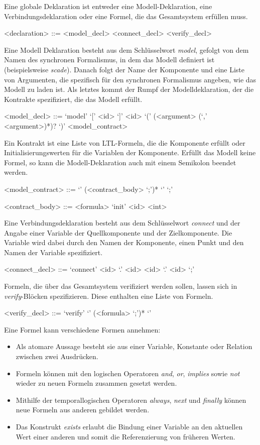 Eine globale Deklaration ist entweder eine Modell-Deklaration, eine Verbindungsdeklaration oder eine Formel, die das Gesamtsystem erfüllen muss.
\begin{grammar}
  <declaration> ::= <model\_decl>
  \alt <connect\_decl>
  \alt <verify\_decl>
\end{grammar}
Eine Modell Deklaration besteht aus dem Schlüsselwort \emph{model}, gefolgt von dem Namen des synchronen Formalismus, in dem das Modell definiert ist (beispielsweise \emph{scade}).
Danach folgt der Name der Komponente und eine Liste von Argumenten, die spezifisch für den synchronen Formalismus angeben, wie das Modell zu laden ist.
Als letztes kommt der Rumpf der Modelldeklaration, der die Kontrakte spezifiziert, die das Modell erfüllt.
\begin{grammar}
  <model\_decl> ::= `model' `[' <id> `]' <id> `(' (<argument> (`,' <argument>)*)? `)' <model\_contract>
\end{grammar}
Ein Kontrakt ist eine Liste von LTL-Formeln, die die Komponente erfüllt oder Initialisierungswerten für die Variablen der Komponente.
Erfüllt das Modell keine Formel, so kann die Modell-Deklaration auch mit einem Semikolon beendet werden.
\begin{grammar}
  <model\_contract> ::= `{' (<contract\_body> `;')* `}'
  \alt `;'

  <contract\_body> ::= <formula>
  \alt `init' <id> <int>
\end{grammar}
Eine Verbindungsdeklaration besteht aus dem Schlüsselwort \emph{connect} und der Angabe einer Variable der Quellkomponente und der Zielkomponente.
Die Variable wird dabei durch den Namen der Komponente, einen Punkt und den Namen der Variable spezifiziert.
\begin{grammar}
  <connect\_decl> ::= `connect' <id> `.' <id> <id> `.' <id> `;'
\end{grammar}
Formeln, die über das Gesamtsystem verifiziert werden sollen, lassen sich in \emph{verify}-Blöcken spezifizieren.
Diese enthalten eine Liste von Formeln.
\begin{grammar}
  <verify\_decl> ::= `verify' `{' (<formula> `;')* `}'
\end{grammar}
Eine Formel kann verschiedene Formen annehmen:
\begin{itemize}
\item Als atomare Aussage besteht sie aus einer Variable, Konstante oder Relation zwischen zwei Ausdrücken.
\item Formeln können mit den logischen Operatoren \emph{and}, \emph{or}, \emph{implies} sowie \emph{not} wieder zu neuen Formeln zusammen gesetzt werden.
\item Mithilfe der temporallogischen Operatoren \emph{always}, \emph{next} und \emph{finally} können neue Formeln aus anderen gebildet werden.
\item Das Konstrukt \emph{exists} erlaubt die Bindung einer Variable an den aktuellen Wert einer anderen und somit die Referenzierung von früheren Werten.
\end{itemize}
